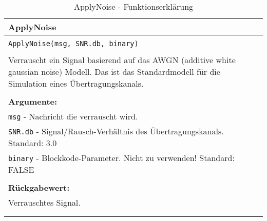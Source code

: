 \begin{longtable}{|p{\textwidth}|}
\hline
\rowcolor{lightblue}
ApplyNoise\\
\hline
\\
\texttt{ApplyNoise(msg, SNR.db, binary)}\\
\\
Verrauscht ein Signal basierend auf das AWGN (additive white gaussian noise) Modell. Das ist das Standardmodell für die Simulation eines Übertragungskanals.\\
\\
\textbf{Argumente:}\\
\texttt{msg} - Nachricht die verrauscht wird.\\
\texttt{SNR.db} - Signal/Rausch-Verhältnis des Übertragungskanals. Standard: 3.0\\
\texttt{binary} - Blockkode-Parameter. Nicht zu verwenden! Standard: FALSE\\
\\
\textbf{Rückgabewert:}\\
Verrauschtes Signal.\\
\\
\hline
\caption{ApplyNoise - Funktionserklärung}
\label{func:applynoise}
\end{longtable}